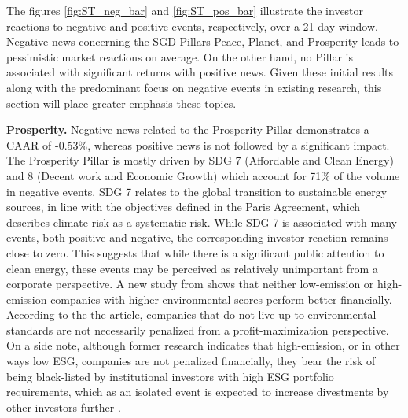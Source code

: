 The figures \ref{fig:ST_neg_bar} and \ref{fig:ST_pos_bar} illustrate the investor reactions to negative and positive events, respectively, over a 21-day window. Negative news concerning the SGD Pillars Peace, Planet, and Prosperity leads to pessimistic market reactions on average. On the other hand, no Pillar is associated with significant returns with positive news. Given these initial results along with the predominant focus on negative events in existing research, this section will place greater emphasis these topics. 

\textbf{Prosperity.} Negative news related to the Prosperity Pillar demonstrates a CAAR of -0.53\%, whereas positive news is not followed by a significant impact. The Prosperity Pillar is mostly driven by SDG 7 (Affordable and Clean Energy) and 8 (Decent work and Economic Growth) which account for 71\% of the volume in negative events. SDG 7 relates to the global transition to sustainable energy sources, in line with the objectives defined in the Paris Agreement, which describes climate risk as a systematic risk. While SDG 7 is associated with many events, both positive and negative, the corresponding investor reaction remains close to zero. This suggests that while there is a significant public attention to clean energy, these events may be perceived as relatively unimportant from a corporate perspective. A new study from \cite{being_green} shows that neither low-emission or high-emission companies with higher environmental scores perform better financially. According to the the article, companies that do not live up to environmental standards are not necessarily penalized from a profit-maximization perspective.
On a side note, although former research indicates that high-emission, or in other ways low ESG, companies are not penalized financially, they bear the risk of being black-listed by institutional investors with high ESG portfolio requirements, which as an isolated event is expected to increase divestments by other investors further \cite{dell2021norwegian}. 

